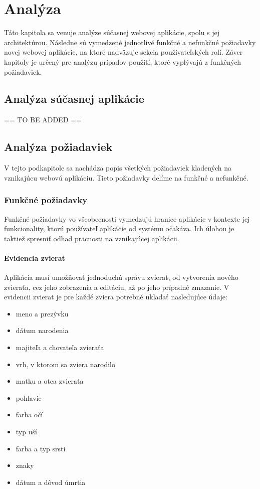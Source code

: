 \chapter{Analýza}
Táto kapitola sa venuje analýze súčasnej webovej aplikácie, spolu s jej architektúrou. Následne sú vymedzené jednotlivé funkčné a nefunkčné požiadavky novej webovej aplikácie, na ktoré nadväzuje sekcia používateľských rolí. Záver kapitoly je určený pre analýzu prípadov použití, ktoré vyplývajú z funkčných požiadaviek.

\section{Analýza súčasnej aplikácie}
== TO BE ADDED ==

\section{Analýza požiadaviek}
V tejto podkapitole sa nachádza popis všetkých požiadaviek kladených na vznikajúcu webovú aplikáciu.
Tieto požiadavky delíme na funkčné a nefunkčné.

\subsection{Funkčné požiadavky}\label{funkcne-poziadavky}
Funkčné požiadavky vo všeobecnosti vymedzujú hranice aplikácie v kontexte jej funkcionality, ktorú používateľ aplikácie od systému očakáva. Ich úlohou je taktiež spresniť odhad pracnosti na vznikajúcej aplikácii.\cite{funkcne-poziadavky}

\subsubsection{Evidencia zvierat}\label{evidencia-zvierat}
Aplikácia musí umožňovať jednoduchú správu zvierat, od vytvorenia nového zvieraťa, cez jeho zobrazenia a editáciu, až po jeho prípadné zmazanie. V evidencii zvierat je pre každé zviera potrebné ukladať nasledujúce údaje:

\begin{itemize}
	\item meno a prezývku
	\item dátum narodenia
	\item majiteľa a chovateľa zvieraťa
	\item vrh, v ktorom sa zviera narodilo
	\item matku a otca zvieraťa
	\item pohlavie
	\item farba očí
	\item typ uší
	\item farba a typ srsti
	\item znaky
	\item dátum a dôvod úmrtia
\end{itemize}

